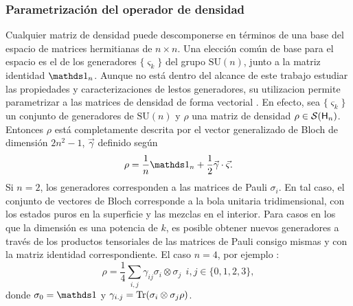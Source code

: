 \subsubsection{Parametrización del operador de densidad}
Cualquier matriz de densidad puede descomponerse en términos de una base del espacio de matrices hermitianas de $n\times n$. Una elección común de base para el espacio es el de los generadores $\{\varsigma_{k}\}$ del grupo $\text{SU}(n)$, junto a la matriz identidad $\Id_{n}$. Aunque no está dentro del alcance de este trabajo estudiar las propiedades y caracterizaciones de lestos generadores, su utilizacion permite parametrizar a las matrices de densidad de forma vectorial \cite{Bruning}. En efecto, sea $\{\varsigma_{k}\}$ un conjunto de generadores de $\text{SU}(n)$ y $\rho$ una matriz de densidad $\rho\in\mathcal{S}({\sf H}_{n})$. Entonces $\rho$ está completamente descrita por el vector generalizado de Bloch de dimensión $2n^{2}-1$, $\vec{\gamma}$ definido según
\begin{equation}
    \rho=\frac{1}{n}\Id_{n}+\frac{1}{2}\vec{\gamma}\cdot\vec{\varsigma}.
\end{equation}
Si $n=2$, los generadores corresponden a las matrices de Pauli $\sigma_{i}$. En tal caso, el conjunto de vectores de Bloch corresponde a la bola unitaria tridimensional, con los estados puros en la superficie y las mezclas en el interior. Para casos en los que la dimensión es una potencia de $k$, es posible obtener nuevos generadores a través de los productos tensoriales de las matrices de Pauli consigo mismas y con la matriz identidad correspondiente. El caso $n=4$, por ejemplo \cite{Chuang}:
\begin{equation}\label{eq::BlochParametrization4}
    \rho=\frac{1}{4}\sum_{i,j}\gamma_{ij}\sigma_{i}\otimes \sigma_{j} \ \ i,j\in\{0,1,2,3\},
\end{equation}
donde $\sigma_{0}=\Id$ y $\gamma_{i.j}=\Tr(\sigma_{i}\otimes \sigma_{j}\rho)$.
